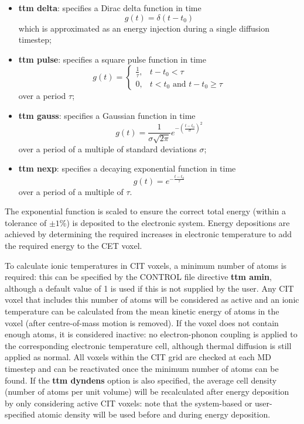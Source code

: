 \begin{itemize}
\item {\bf ttm delta}: specifies a Dirac delta function in time \begin{equation*} g(t) = \delta (t - t_0) \end{equation*} which is approximated as an energy injection during a single diffusion timestep;
\item {\bf ttm pulse}: specifies a square pulse function in time \begin{equation*} g(t) = \left\{\begin{array}{lr} \frac{1}{\tau}, & t - t_0 < \tau\\ 0, & t<t_0 \text{ and } t - t_0 \ge \tau \end{array} \right. \end{equation*} over a period $\tau$;
\item {\bf ttm gauss}: specifies a Gaussian function in time \begin{equation*} g(t) = \frac{1}{\sigma\sqrt{2\pi}}e^{-\left(\frac{t-t_0}{\sigma}\right)^2} \end{equation*} over a period of a multiple of standard deviations $\sigma$;
\item {\bf ttm nexp}: specifies a decaying exponential function in time \begin{equation*} g(t) = e^{-\frac{t-t_0}{\tau}} \end{equation*} over a period of a multiple of $\tau$.
\end{itemize}
The exponential function is scaled to ensure the correct total energy 
(within a tolerance of $\pm 1$\%) is deposited to the electronic system. 
Energy depositions are achieved by determining the required increases 
in electronic temperature to add the required energy to the CET voxel.

To calculate ionic temperatures in CIT voxels, a minimum number of 
atoms is required: this can be specified by the CONTROL file directive 
{\bf ttm amin}, although a default value of 1 is used if this is not supplied 
by the user. Any CIT voxel that includes this number of atoms will be 
considered as active and an ionic temperature can be calculated from 
the mean kinetic energy of atoms in the voxel (after centre-of-mass 
motion is removed). If the voxel does not contain enough atoms, it is 
considered inactive: no electron-phonon coupling is applied to the 
corresponding electronic temperature cell, although thermal diffusion is 
still applied as normal. All voxels within the CIT grid are checked 
at each MD timestep and can be reactivated once the minimum number 
of atoms can be found. If the {\bf ttm dyndens} option is also specified,
the average cell density (number of atoms per unit volume) will be 
recalculated after energy deposition by only considering active CIT 
voxels: note that the system-based or user-specified atomic density
will be used before and during energy deposition.

